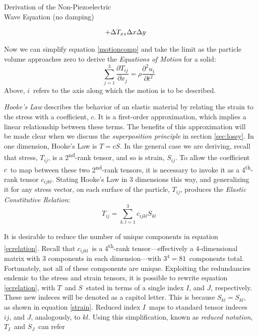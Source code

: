 \documentclass[a4paper,10pt]{report}
\numberwithin{equation}{section}
\begin{document}
{\begin{chapter}
\begin{section}{Derivation of the Non-Piezoelectric \\Wave Equation (no damping)}
\begin{singlespace}
\begin{align}
+ &\Delta T_{xz} \Delta x \Delta y \notag
\end{align}
\end{singlespace}
Now we can simplify equation \eqref{motioncomp} and take the limit as the
particle volume approaches zero to derive the \emph{Equations of Motion} for a
solid:
\begin{equation}
 \sum_{j=1}^{3} \frac{\partial T_{ij}}{\partial x_j} = \rho \frac{\partial ^2
u_i}{\partial t^2}
\end{equation}
Above, $i$\  refers to the axis along which the motion is to be described.\cite[p.~16]{Ballantine1997} \cite[p.~4]{Kino1987}
\par
\emph{Hooke's Law} describes the behavior of an elastic material by relating the strain
to the stress with a coefficient, $c$. It is a first-order approximation, which implies a linear relationship between these terms. The benefits of this approximation will be made clear when we discuss the \emph{superposition principle} in section \ref{sec:lossy}. In one dimension, Hooke's Law is $T = cS$. In the general case we are deriving, recall that stress, $T_{ij}$, is a 2\textsuperscript{nd}-rank tensor, and so is strain, $S_{ij}$. To allow the coefficient $c$\  to map between these two 2\textsuperscript{nd}-rank tensors, it is necessary to invoke it as a 4\textsuperscript{th}-rank tensor $c_{ijkl}$. Stating Hooke's Law in 3 dimensions this way, and generalizing it for any stress vector, on each surface of the particle, $T_{ij}$, produces the \emph{Elastic Constitutive Relation}\cite[p.~542]{Kino1987}:
\begin{equation}
 T_{ij} = \sum_{k,l=1}^3 c_{ijkl} S_{kl}
\end{equation}
\par
It is desirable to reduce the number of unique components in equation
\eqref{ecrelation}. Recall that $c_{ijkl}$\  is a 4\textsuperscript{th}-rank
tensor---effectively a 4-dimensional matrix with 3 components in each dimension---with $3^4 = 81$\  components total. Fortunately, not all of these components are unique. Exploiting the redundancies endemic to the stress and strain tensors, it is
possible to rewrite equation \eqref{ecrelation}, with $T$\  and $S$\  stated in terms 
of a single index $I$, and $J$, respectively. These new indeces will be denoted as a capitol letter. This is because $S_{kl} =
S_{kl}$, as shown in equation \eqref{strain}. Reduced index $I$\  maps to standard tensor indeces $ij$, and $J$, analogously, to $kl$. 
Using this simplification, known as \emph{reduced notation}, $T_I$\  and $S_J$\  can refer

\end{section}
\end{chapter}}
\end{document}
